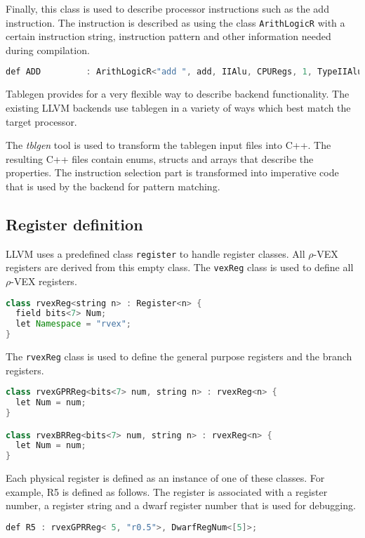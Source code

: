 Finally, this class is used to describe processor instructions such as the add instruction. The instruction is described as using the class \texttt{ArithLogicR} with a certain instruction string, instruction pattern and other information needed during compilation.
\begin{lstlisting}[language=java]
def ADD         : ArithLogicR<"add ", add, IIAlu, CPURegs, 1, TypeIIAlu>;
\end{lstlisting}

Tablegen provides for a very flexible way to describe backend functionality. The existing LLVM backends use tablegen in a variety of ways which best match the target processor. 

The \emph{tblgen} tool is used to transform the tablegen input files into C++. The resulting C++ files contain enums, structs and arrays that describe the properties. The instruction selection part is transformed into imperative code that is used by the backend for pattern matching. 

\subsection{Register definition}
LLVM uses a predefined class \texttt{register} to handle register classes. All $\rho$-VEX registers are derived from this empty class. The \texttt{vexReg} class is used to define all $\rho$-VEX registers. 

\begin{lstlisting}[language=java]
class rvexReg<string n> : Register<n> {
  field bits<7> Num;
  let Namespace = "rvex";
}
\end{lstlisting}

The \texttt{rvexReg} class is used to define the general purpose registers and the branch registers.
\begin{lstlisting}[language=java]
class rvexGPRReg<bits<7> num, string n> : rvexReg<n> {
  let Num = num;
}

class rvexBRReg<bits<7> num, string n> : rvexReg<n> {
  let Num = num;
}
\end{lstlisting}

Each physical register is defined as an instance of one of these classes. For example, R5 is defined as follows. The register is associated with a register number, a register string and a dwarf register number that is used for debugging.

\begin{lstlisting}[language=java]
def R5 : rvexGPRReg< 5, "r0.5">, DwarfRegNum<[5]>;
\end{lstlisting}

